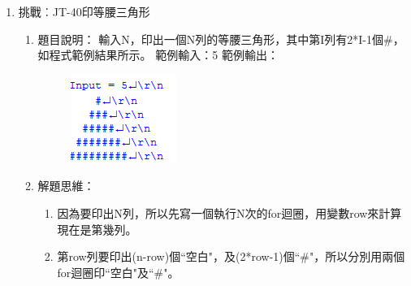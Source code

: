 \begin{enumerate}
\begin{enumerate}

		\end{enumerate}
	
	\item 挑戰︰JT-40印等腰三角形
		\begin{enumerate}
			\item 題目說明：
			\subitem 輸入N，印出一個N列的等腰三角形，其中第I列有2*I-1個\#，如程式範例結果所示。
			\subitem 範例輸入：5
			\subitem 範例輸出：
			\begin{figure}[H]
				\centering
				\includegraphics{fig/JT40fig}
			\end{figure}
			
			\item 解題思維：
			\begin{enumerate}
				\item 因為要印出N列，所以先寫一個執行N次的for迴圈，用變數row來計算現在是第幾列。
				\item 第row列要印出(n-row)個``空白"，及(2*row-1)個``\#"，所以分別用兩個for迴圈印``空白"及``\#"。
			\end{enumerate}

		\end{enumerate}

\end{enumerate}

